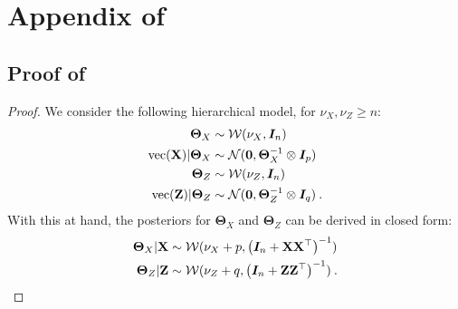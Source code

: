 
\section{Appendix of }


\subsection{Proof of }

\PCAgraphcoupling*

\begin{proof}
We consider the following hierarchical model, for $\nu_{X}, \nu_{Z} \geq n$:
\begin{align*}
    \bm{\Theta}_{X} &\sim  \mathcal{W}(\nu_{X}, \bm{I}_n) \\
    \mathrm{vec}(\mathbf{X}) | \bm{\Theta}_{X} &\sim \mathcal{N}(\bm{0}, \bm{\Theta}_{X}^{-1} \otimes \bm{I}_p) \\
    \bm{\Theta}_{Z} &\sim  \mathcal{W}(\nu_{Z}, \bm{I}_n) \\
    \mathrm{vec}(\mathbf{Z}) | \bm{\Theta}_{Z} &\sim \mathcal{N}(\bm{0}, \bm{\Theta}_{Z}^{-1} \otimes \bm{I}_q) \:.
\end{align*}
With this at hand, the posteriors for $\bm{\Theta}_X$ and $\bm{\Theta}_Z$ can be derived in closed form: 
\begin{align*}
    \bm{\Theta}_{X} | \mathbf{X} &\sim  \mathcal{W}(\nu_{X}+p, \left(\bm{I}_n + \mathbf{X} \mathbf{X}^\top\right)^{-1}) \\
    \bm{\Theta}_{Z} | \mathbf{Z} &\sim  \mathcal{W}(\nu_{Z} + q, \left(\bm{I}_n + \mathbf{Z} \mathbf{Z}^\top\right)^{-1}) \:.
\end{align*}


\end{proof}
